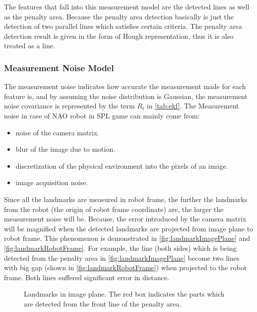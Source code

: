 The features that fall into this measurement model are the detected lines as well as the penalty area. Because the penalty area detection basically is just the detection of two parallel lines which satisfies certain criteria. The penalty area detection result is given in the form of Hough representation, thus it is also treated as a line.

\subsubsection{Measurement Noise Model}
\label{sub:Measurement Noise Model}
The measurement noise indicates how accurate the measurement made for each feature is, and by assuming the noise distribution is Gaussian, the measurement noise covariance is represented by the term $R_{t}$ in \autoref{tab:ekf}. The Measurement noise in case of NAO robot in \gls{SPL} game can mainly come from:
\begin{itemize}
  \item noise of the camera matrix.
  \item blur of the image due to motion.
  \item discretization of the physical environment into the pixels of an image.
  \item image acquisition noise.
\end{itemize}
Since all the landmarks are measured in robot frame, the further the landmarks from the robot (the origin of robot frame coordinate) are, the larger the measurement noise will be. Because, the error introduced by the camera matrix will be magnified when the detected landmarks are projected from image plane to robot frame. This phenomenon is demonstrated in \autoref{fig:landmarkImagePlane} and \autoref{fig:landmarkRobotFrame}. For example, the line (both sides) which is being detected from the penalty area in \autoref{fig:landmarkImagePlane} become two lines with big gap (shown in \autoref{fig:landmarkRobotFrame}) when projected to the robot frame. Both lines suffered significant error in distance.\\

\begin{figure}[h!]
  \centering
{}
\caption[Landmarks in image plane]{Landmarks in image plane. The red box indicates the parts which are detected from the front line of the penalty area.}
  \label{fig:landmarkImagePlane}
\end{figure}


